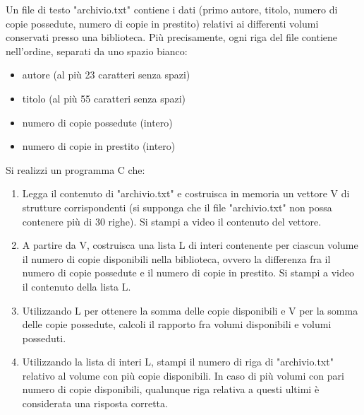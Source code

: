 \begin{Exercise}[label={ex:archivio}]
    Un file di testo "archivio.txt" contiene i dati (primo autore, titolo, numero di copie possedute, 
    numero di copie in prestito) relativi ai differenti volumi conservati presso una biblioteca.
    Più precisamente, ogni riga del file contiene nell'ordine, separati da uno spazio bianco:
    \begin{itemize}
        \item autore (al più 23 caratteri senza spazi)
        \item titolo (al più 55 caratteri senza spazi)
        \item numero di copie possedute (intero)
        \item numero di copie in prestito (intero)
    \end{itemize}

    Si realizzi un programma C che:
    \begin{enumerate}
        \item Legga il contenuto di "archivio.txt" e costruisca in memoria un vettore V di strutture
        corrispondenti (si supponga che il file "archivio.txt" non possa contenere più di 30 righe). 
        Si stampi a video il contenuto del vettore.
        \item A partire da V, costruisca una lista L di interi contenente per ciascun volume il 
        numero di copie disponibili nella biblioteca, ovvero la differenza fra il numero di copie 
        possedute e il numero di copie in prestito. Si stampi a video il contenuto della lista L.
        \item Utilizzando L per ottenere la somma delle copie disponibili e V per la somma delle
        copie possedute, calcoli il rapporto fra volumi disponibili e volumi posseduti.
        \item  Utilizzando la lista di interi L, stampi il numero di riga di "archivio.txt" 
        relativo al volume con più copie disponibili. In caso di più volumi con pari numero di copie 
        disponibili, qualunque riga relativa a questi ultimi è considerata una risposta corretta.
    \end{enumerate}
\end{Exercise}

\begin{Answer}[ref={ex:archivio}]
  	
\end{Answer}